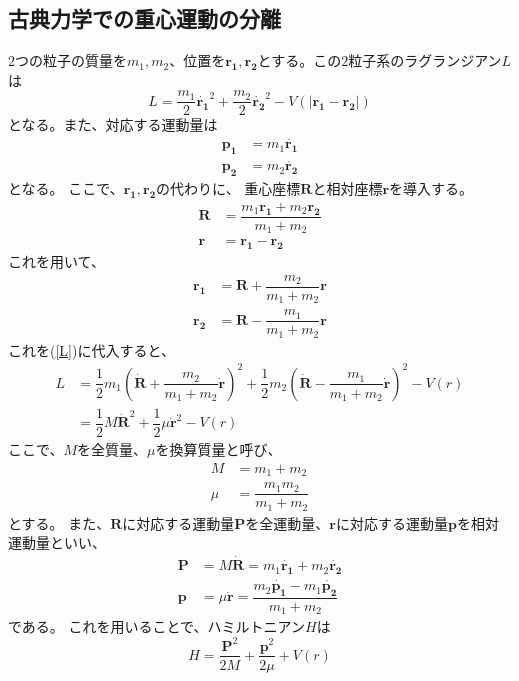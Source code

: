 \documentclass[a4paper,16pt]{jsarticle}
\begin{document}
\subsection{古典力学での重心運動の分離}
$2$つの粒子の質量を$m_1, m_2$、位置を$\bm{r_1},\bm{r_2}$とする。この$2$粒子系のラグランジアン$L$は
\begin{equation}
	\label{L}
	L = \dfrac{m_1}{2}\dot{\bm{r_1}}^2 + \dfrac{m_2}{2}\dot{\bm{r_2}}^2 - V(|\bm{r_1} - \bm{r_2}|)
\end{equation}
となる。また、対応する運動量は
\begin{align}
	\bm{p_1} &= m_1\dot{\bm{r_1}} \\
	\bm{p_2} &= m_2\dot{\bm{r_2}}
\end{align}
となる。
ここで、$\bm{r_1},\bm{r_2}$の代わりに、
重心座標$\bm{R}$と相対座標$\bm{r}$を導入する。
\begin{align}
	\label{CM_R}
	\bm{R} &= \dfrac{m_1\bm{r_1} + m_2\bm{r_2}}{m_1 + m_2} \\
	\label{rel_r}
	\bm{r} &= \bm{r_1} - \bm{r_2}
\end{align}
これを用いて、
\begin{align}
	\bm{r_1} &= \bm{R} + \dfrac{m_2}{m_1 + m_2}\bm{r} \\
	\bm{r_2} &= \bm{R} - \dfrac{m_1}{m_1 + m_2}\bm{r}
\end{align}
これを(\ref{L})に代入すると、
\begin{align}
	L &= \dfrac{1}{2}m_1\left( \dot{\bm{R}} + \dfrac{m_2}{m_1 + m_2}\dot{\bm{r}} \right)^2
		+ \dfrac{1}{2}m_2\left( \dot{\bm{R}} - \dfrac{m_1}{m_1 + m_2}\dot{\bm{r}} \right)^2
		- V(r) \\
		&= \dfrac{1}{2}M\dot{\bm{R}}^2 + \dfrac{1}{2}\mu\dot{\bm{r}}^2 - V(r)
\end{align}
ここで、$M$を全質量、$\mu$を換算質量と呼び、
\begin{align}
	M &= m_1 + m_2 \\
	\mu &= \dfrac{m_1m_2}{m_1+m_2}
\end{align}
とする。
また、$\bm{R}$に対応する運動量$\bm{P}$を全運動量、$\bm{r}$に対応する運動量$\bm{p}$を相対運動量といい、
\begin{align}
	\label{CM_P}
	\bm{P} &= M\dot{\bm{R}} = m_1\dot{\bm{r_1}} + m_2\dot{\bm{r_2}} \\
	\label{rel_p}
	\bm{p} &= \mu\dot{\bm{r}} = \dfrac{m_2\dot{\bm{p_1}} - m_1\dot{\bm{p_2}}}{m_1 + m_2}
\end{align}
である。
これを用いることで、ハミルトニアン$H$は
\begin{equation}
	H = \dfrac{\bm{P}^2}{2M} + \dfrac{\bm{p}^2}{2\mu} + V(r)
\end{equation}
\end{document}
